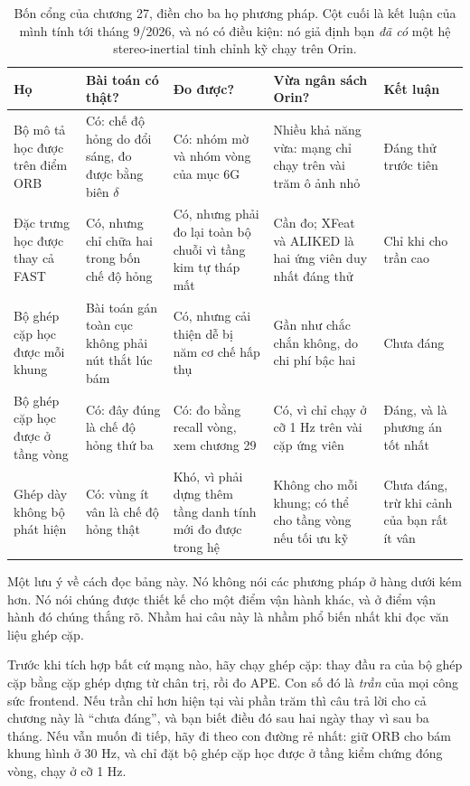 \documentclass[../../deep_learning.tex]{subfiles}
\begin{document}
\begin{table}[H]\centering\footnotesize
\caption{Bốn cổng của chương 27, điền cho ba họ phương pháp. Cột cuối là kết luận của mình tính tới tháng 9/2026, và nó có điều kiện: nó giả định bạn \emph{đã có} một hệ stereo-inertial tinh chỉnh kỹ chạy trên Orin.}
\label{tab:f28-bon-cong}
\begin{tabularx}{\linewidth}{@{}L{2.2cm}L{2.9cm}L{2.6cm}YL{2.4cm}@{}}
\toprule
\textbf{Họ} & \textbf{Bài toán có thật?} & \textbf{Đo được?} & \textbf{Vừa ngân sách Orin?} & \textbf{Kết luận}\\
\midrule
Bộ mô tả học được trên điểm ORB & Có: chế độ hỏng do đổi sáng, đo được bằng biên \(\delta\) & Có: nhóm mờ và nhóm vòng của mục 6G & Nhiều khả năng vừa: mạng chỉ chạy trên vài trăm ô ảnh nhỏ & Đáng thử trước tiên\\
Đặc trưng học được thay cả FAST & Có, nhưng chỉ chữa hai trong bốn chế độ hỏng & Có, nhưng phải đo lại toàn bộ chuỗi vì tầng kim tự tháp mất & Cần đo; XFeat và ALIKED là hai ứng viên duy nhất đáng thử & Chỉ khi  cho trần cao\\
Bộ ghép cặp học được mỗi khung & Bài toán gán toàn cục không phải nút thắt lúc bám & Có, nhưng cải thiện dễ bị năm cơ chế hấp thụ & Gần như chắc chắn không, do chi phí bậc hai & Chưa đáng\\
Bộ ghép cặp học được ở tầng vòng & Có: đây đúng là chế độ hỏng thứ ba & Có: đo bằng recall vòng, xem chương 29 & Có, vì chỉ chạy ở cỡ 1 Hz trên vài cặp ứng viên & Đáng, và là phương án tốt nhất\\
Ghép dày không bộ phát hiện & Có: vùng ít vân là chế độ hỏng thật & Khó, vì phải dựng thêm tầng danh tính mới đo được trong hệ & Không cho mỗi khung; có thể cho tầng vòng nếu tối ưu kỹ & Chưa đáng, trừ khi cảnh của bạn rất ít vân\\
\bottomrule
\end{tabularx}
\end{table}

Một lưu ý về cách đọc bảng này. Nó không nói các phương pháp ở hàng dưới kém hơn. Nó nói chúng được thiết kế cho một điểm vận hành khác, và ở điểm vận hành đó chúng thắng rõ. Nhầm hai câu này là nhầm phổ biến nhất khi đọc văn liệu ghép cặp.

\begin{cannho}
Trước khi tích hợp bất cứ mạng nào, hãy chạy  ghép cặp: thay đầu ra của bộ ghép cặp bằng cặp ghép dựng từ chân trị, rồi đo APE. Con số đó là \emph{trần} của mọi công sức frontend. Nếu trần chỉ hơn hiện tại vài phần trăm thì câu trả lời cho cả chương này là ``chưa đáng'', và bạn biết điều đó sau hai ngày thay vì sau ba tháng. Nếu vẫn muốn đi tiếp, hãy đi theo con đường rẻ nhất: giữ ORB cho bám khung hình ở 30 Hz, và chỉ đặt bộ ghép cặp học được ở tầng kiểm chứng đóng vòng, chạy ở cỡ 1 Hz.
\end{cannho}
\end{document}
